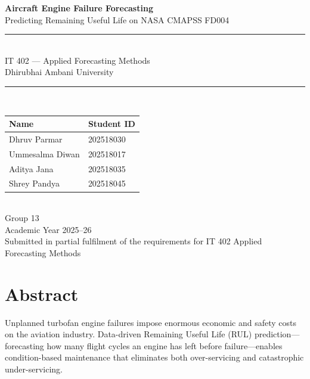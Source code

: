 \documentclass[12pt,a4paper]{report}
\begin{document}
\begin{titlepage}
\centering
\vspace*{2cm}

{\LARGE\bfseries Aircraft Engine Failure Forecasting}\\[0.5cm]
{\large Predicting Remaining Useful Life on NASA CMAPSS FD004}\\[2cm]

\rule{\linewidth}{0.8pt}\\[0.4cm]
{\large IT 402 — Applied Forecasting Methods}\\[0.2cm]
{\large Dhirubhai Ambani University}\\[0.4cm]
\rule{\linewidth}{0.8pt}\\[1.5cm]

\begin{tabular}{ll}
\toprule
\textbf{Name} & \textbf{Student ID} \\
\midrule
Dhruv Parmar & 202518030 \\
Ummesalma Diwan & 202518017 \\
Aditya Jana & 202518035 \\
Shrey Pandya & 202518045 \\
\bottomrule
\end{tabular}\\[1.5cm]

{\large Group 13}\\[0.5cm]
{\large Academic Year 2025--26}\\[2cm]

\vfill
{\small Submitted in partial fulfilment of the requirements for IT 402 Applied Forecasting Methods}
\end{titlepage}

\chapter*{Abstract}

Unplanned turbofan engine failures impose enormous economic and safety costs on the aviation industry. Data-driven Remaining Useful Life (RUL) prediction—forecasting how many flight cycles an engine has left before failure—enables condition-based maintenance that eliminates both over-servicing and catastrophic under-servicing.
\end{document}

